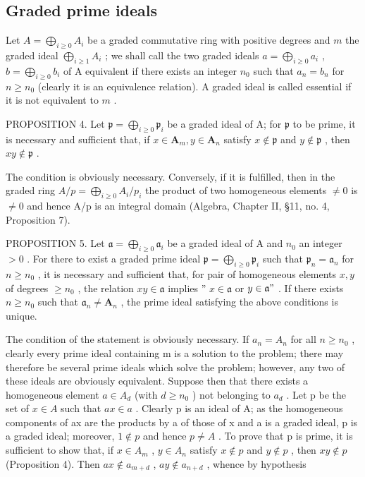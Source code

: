 \subsection{Graded prime ideals}

Let \(A = \bigoplus_{i \geqslant 0} A_i\) be a graded commutative ring with positive degrees and \(m\) the graded ideal \(\bigoplus_{i \geqslant 1} A_i\) ; we shall call the two graded ideals \(a = \bigoplus_{i \geqslant 0} a_i\) , \(b = \bigoplus_{i \geqslant 0} b_i\) of A equivalent if there exists an integer \(n_0\) such that \(a_n = b_n\) for \(n \geqslant n_0\) (clearly it is an equivalence relation). A graded ideal is called essential if it is not equivalent to \(m\) .

PROPOSITION 4. Let \(\mathfrak{p} = \bigoplus_{i\geqslant 0}\mathfrak{p}_i\) be a graded ideal of A; for \(\mathfrak{p}\) to be prime, it is necessary and sufficient that, if \(x\in \mathbf{A}_m,y\in \mathbf{A}_n\) satisfy \(x\notin \mathfrak{p}\) and \(y\notin \mathfrak{p}\) , then \(xy\notin \mathfrak{p}\) .

The condition is obviously necessary. Conversely, if it is fulfilled, then in the graded ring \(A/p = \bigoplus_{i \geq 0} A_i/p_i\) the product of two homogeneous elements \(\neq 0\) is \(\neq 0\) and hence A/p is an integral domain (Algebra, Chapter II, §11, no. 4, Proposition 7).

PROPOSITION 5. Let \(\mathfrak{a} = \bigoplus_{i\geqslant 0}\mathfrak{a}_i\) be a graded ideal of A and \(n_0\) an integer \(>0\) . For there to exist a graded prime ideal \(\mathfrak{p} = \bigoplus_{i\geqslant 0}\mathfrak{p}_i\) such that \(\mathfrak{p}_n = \mathfrak{a}_n\) for \(n\geqslant n_0\) , it is necessary and sufficient that, for pair of homogeneous elements \(x,y\) of degrees \(\geqslant n_0\) , the relation \(xy\in \mathfrak{a}\) implies '' \(x\in \mathfrak{a}\) or \(y\in \mathfrak{a}"\) . If there exists \(n\geqslant n_0\) such that \(\mathfrak{a}_n\neq \mathbf{A}_n\) , the prime ideal satisfying the above conditions is unique.

The condition of the statement is obviously necessary. If \(a_{n} = A_{n}\) for all \(n \geqslant n_{0}\) , clearly every prime ideal containing m is a solution to the problem; there may therefore be several prime ideals which solve the problem; however, any two of these ideals are obviously equivalent. Suppose then that there exists a homogeneous element \(a \in A_{d}\) (with \(d \geqslant n_{0}\) ) not belonging to \(a_{d}\) . Let p be the set of \(x \in A\) such that \(ax \in a\) . Clearly p is an ideal of A; as the homogeneous components of ax are the products by a of those of x and a is a graded ideal, p is a graded ideal; moreover, \(1 \notin p\) and hence \(p \neq A\) . To prove that p is prime, it is sufficient to show that, if \(x \in A_{m}\) , \(y \in A_{n}\) satisfy \(x \notin p\) and \(y \notin p\) , then \(xy \notin p\) (Proposition 4). Then \(ax \notin a_{m+d}\) , \(ay \notin a_{n+d}\) , whence by hypothesis

